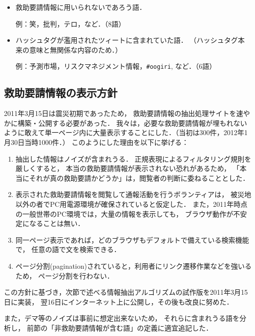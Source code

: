 \documentclass[japanese]{jnlp_1.4}
\begin{document}
\begin{enumerate}
\begin{itemize}
    {例：セシウム，ヨウ素，ウラン，プルトニウム，ストロンチウム，マイクロ，ベクレル，シーベルト，放射線，放射能．（10語）}

  \item {救助要請情報に用いられないであろう語．}

    {例：笑，批判，テロ，など．（8語）}

  \item 
    {ハッシュタグが濫用されたツィートに含まれていた語．}
    （ハッシュタグ{本来の意味}と無関係な内容のため．）

    {例：予測市場，リスクマネジメント情報，{\tt \#oogiri}, など．（6語）}
  \end{itemize}
\end{enumerate}


\subsection{救助要請情報の表示方針}

2011年3月15日は震災初期であったため，
救助要請情報の抽出処理サイトを速やかに構築・公開する必要があった．
我々は，必要な救助要請情報が埋もれないように敢えて単一ページ内に大量表示することにした．（当初は300件，2012年1月30日当時1000件．）
このようにした理由を以下に挙げる：
\begin{enumerate}
\item 抽出した情報はノイズが含まれうる．
  正規表現によるフィルタリング規則を厳しくすると，
  本当の救助要請情報が表示されない恐れがあるため，
  「本当にそれが真の救助要請かどうか」は，閲覧者の判断に委ねることとした．
\item 表示された救助要請情報を閲覧して通報活動を行うボランティアは，
  被災地以外の者でPC用電源環境が確保されていると仮定した．
  また，2011年時点の一般世帯のPC環境では，大量の情報を表示しても，
  ブラウザ動作が不安定になることは無い．
\item 同一ページ表示であれば，どのブラウザもデフォルトで備えている検索機能で，
  任意の語で文を検索できる．
\item ページ分割(pagination)されていると，利用者にリンク遷移作業などを強いるため，
  ページ分割を行わない．
\end{enumerate}
この方針に基づき，次節で述べる情報抽出アルゴリズムの試作版を2011年3月15日に実装，
翌16日にインターネット上に公開\cite{extraction}し，その後も改良に努めた．

また，デマ等のノイズは事前に想定出来ないため，
それらに含まれうる語を分析し，
前節の「非救助要請情報が含む語」の定義に適宜追記した．
\end{document}
